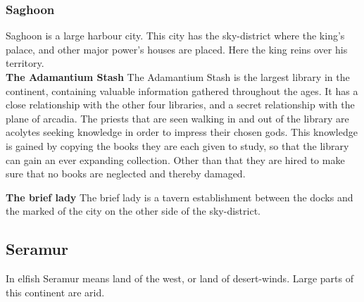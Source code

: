 \documentclass[a4paper]{article}
\begin{document}
\subsubsection{Saghoon}
Saghoon is a large harbour city. This city has the sky-district where the king's palace, and other major power's houses are placed. Here the king reins over his territory.
\\
\textbf{The Adamantium Stash}
The Adamantium Stash is the largest library in the continent, containing valuable information gathered throughout the ages. It has a close relationship with the other four libraries, and a secret relationship with the plane of arcadia. The priests that are seen walking in and out of the library are acolytes seeking knowledge in order to impress their chosen gods. This knowledge is gained by copying the books they are each given to study, so that the library can gain an ever expanding collection. Other than that they are hired to make sure that no books are neglected and thereby damaged.   

\textbf{The brief lady}
The brief lady is a tavern establishment between the docks and the marked of the city on the other side of the sky-district.

\subsection{Seramur}
In elfish Seramur means land of the west, or land of desert-winds. Large parts of this continent are arid.
\end{document}
